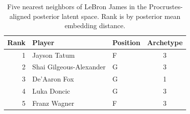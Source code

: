 \begin{table}[htbp]
  \centering\small
  \begin{tabular}{rllc}
    \toprule
    Rank & Player & Position & Archetype \\
    \midrule
    1 & Jayson Tatum & F & 3 \\
    2 & Shai Gilgeous-Alexander & G & 3 \\
    3 & De'Aaron Fox & G & 1 \\
    4 & Luka Doncic & G & 3 \\
    5 & Franz Wagner & F & 3 \\
    \bottomrule
  \end{tabular}
  \caption{Five nearest neighbors of LeBron James in the Procrustes-aligned posterior latent space. Rank is by posterior mean embedding distance.}
  \label{tab:LeBron_James_neighbors}
\end{table}

